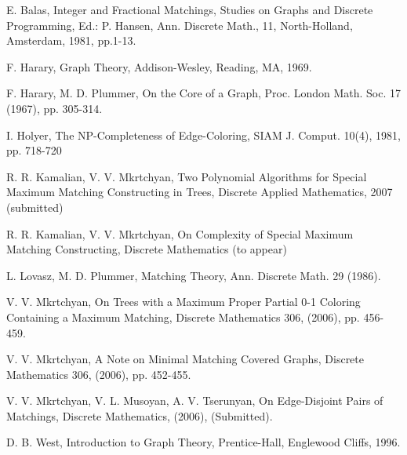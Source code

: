 \documentclass[a4paper, 12pt]{article}
\begin{document}
\begin{center}

\begin{thebibliography}{0}

 E. Balas, Integer and Fractional Matchings, Studies
on Graphs and Discrete Programming, Ed.: P. Hansen, Ann. Discrete
Math., 11, North-Holland, Amsterdam, 1981, pp.1-13.

 F. Harary, Graph Theory, Addison-Wesley, Reading, MA,
1969.

 F. Harary, M. D. Plummer, On the Core of a Graph,
Proc. London Math. Soc. 17 (1967), pp. 305-314.

 I. Holyer, The NP-Completeness of Edge-Coloring,
SIAM J. Comput. 10(4), 1981, pp. 718-720

 R. R. Kamalian, V. V. Mkrtchyan, Two Polynomial
Algorithms for Special Maximum Matching Constructing in Trees,
Discrete Applied Mathematics, 2007 (submitted)

 R. R. Kamalian, V. V. Mkrtchyan, On Complexity of Special
Maximum Matching Constructing, Discrete Mathematics (to appear)

 L. Lovasz, M. D. Plummer, Matching Theory, Ann. Discrete Math.
29 (1986).

 V. V. Mkrtchyan, On Trees with a Maximum Proper
Partial 0-1 Coloring Containing a Maximum Matching, Discrete
Mathematics 306, (2006), pp. 456-459.

 V. V. Mkrtchyan, A Note on Minimal Matching Covered Graphs, Discrete
Mathematics 306, (2006), pp. 452-455.

 V. V. Mkrtchyan, V. L. Musoyan, A. V. Tserunyan, On
Edge-Disjoint Pairs of Matchings, Discrete Mathematics, (2006),
(Submitted).

 D. B. West, Introduction to Graph Theory,
Prentice-Hall, Englewood Cliffs, 1996.

\end{thebibliography}
\end{center}
\end{document}
